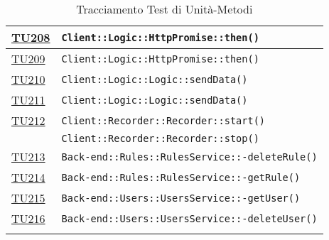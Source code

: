 \begin{longtable}{|>{\centering}m{1cm}|m{12cm}<{\centering}|}
\hyperlink{TU208}{TU208} & \texttt{Client::Logic::HttpPromise::then()}\\ \hline

\hyperlink{TU209}{TU209} & \texttt{Client::Logic::HttpPromise::then()}\\ \hline

\hyperlink{TU210}{TU210} & \texttt{Client::Logic::Logic::sendData()}\\ \hline

\hyperlink{TU211}{TU211} & \texttt{Client::Logic::Logic::sendData()}\\ \hline

\hyperlink{TU212}{TU212} & \texttt{Client::Recorder::Recorder::start()}\\ & \texttt{Client::Recorder::Recorder::stop()}\\ \hline

\hyperlink{TU213}{TU213} & \texttt{Back-end::Rules::RulesService::-\linebreak deleteRule()}\\ \hline

\hyperlink{TU214}{TU214} & \texttt{Back-end::Rules::RulesService::-\linebreak getRule()}\\ \hline

\hyperlink{TU215}{TU215} & \texttt{Back-end::Users::UsersService::-\linebreak getUser()}\\ \hline

\hyperlink{TU216}{TU216} & \texttt{Back-end::Users::UsersService::-\linebreak deleteUser()}\\ \hline

\caption[Tracciamento Test di Unità-Metodi]{Tracciamento Test di Unità-Metodi}
\label{tabella:tu-met}
\end{longtable}
\clearpage

